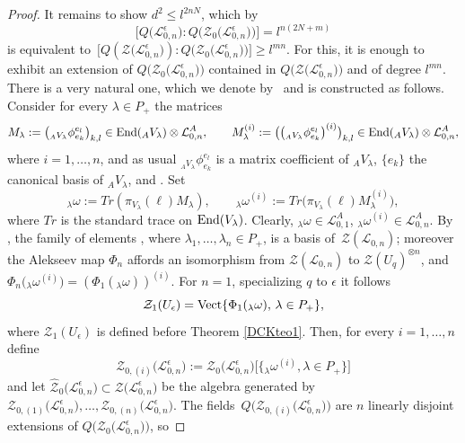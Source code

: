 \documentclass[10pt,a4paper]{amsart}
\numberwithin{equation}{section}
\theoremstyle{definition}
\newcommand{\e}{\epsilon}
\newcommand{\Ll}{{\mathcal L}}
\begin{document}
\begin{proof}
It remains to show $d^2\leq l^{2nN}$, which by \[\bigl[Q\bigl(\Ll_{0,n}^\e\bigr):Q\bigl(\mathcal{Z}_0\bigl(\Ll_{0,n}^\e\bigr)\bigr)\bigr]= l^{n(2N+m)}\] is equivalent to~${\bigl[Q(\mathcal{Z}\bigl(\Ll_{0,n}^\e\bigr)):Q\bigl(\mathcal{Z}_0\bigl(\Ll_{0,n}^\e\bigr)\bigr)\bigr] \geq l^{mn}}$. For this, it is enough to exhibit an extension of $Q\bigl(\mathcal{Z}_0\bigl(\Ll_{0,n}^\e\bigr)\bigr)$ contained in $Q\bigl(\mathcal{Z}\bigl(\Ll_{0,n}^\e\bigr)\bigr)$ and of degree $l^{mn}$. There is a very natural one, which we denote by~\smash{$Q\big(\hat{\mathcal{Z}}_{0}\bigl(\Ll_{0,n}^\e\bigr)\big)$} and is constructed as follows. Consider for every $\lambda\in P_+$ the matrices
\[
M_\lambda:=\bigl({}_{{}_AV_{\lambda}}\phi_{e_k}^{e_l}\bigr)_{k,l}\in {\rm End}({}_AV_{\lambda})\otimes\Ll_{0,n}^A,\qquad M_\lambda^{(i)}:=\big(\bigl({}_{{}_AV_{\lambda}}\phi_{e_k}^{e_l}\bigr)^{(i)}\big)_{k,l}\in {\rm End}({}_AV_{\lambda})\otimes\Ll_{0,n}^A,
\]
where $i=1,\dots,n$, and as usual ${}_{{}_AV_{\lambda}}\phi_{e_k}^{e_l}$ is a matrix coefficient of ${}_AV_{\lambda}$, $\{e_k\}$ the canonical basis of ${}_AV_{\lambda}$, and . Set
\[
{}_{\lambda}\omega := Tr(\pi_{V_{\lambda}}(\ell)M_\lambda),\qquad {}_{\lambda}\omega^{(i)} := Tr\big(\pi_{V_{\lambda}}(\ell)M_\lambda^{(i)}\big),
\]
where $Tr$ is the standard trace on ${\rm End}(V_{\lambda})$. Clearly, ${}_{\lambda}\omega\in \Ll_{0,1}^A$, ${}_{\lambda}\omega^{(i)}\in \Ll_{0,n}^A$. By \cite[Propositions~4.8 and~6.24]{BR}, the family of elements , where $\lambda_1,\dots, \lambda_n\in P_+$, is a basis of~$\mathcal{Z}(\Ll_{0,n})$; moreover the Alekseev map $\Phi_n$ affords an isomorphism from $\mathcal{Z}(\Ll_{0,n})$ to $\mathcal{Z}(U_q)^{\otimes n}$, and $\Phi_n\big({}_{\lambda}\omega^{(i)}\big) = (\Phi_1({}_{\lambda}\omega))^{(i)}$. For $n=1$, specializing $q$ to $\e$ it follows
\begin{equation}\label{Z1omegalambda}
\mathcal{Z}_1(U_\e) = {\rm Vect} \lbrace \Phi_1({}_{\lambda}\omega), \, \lambda\in P_+ \rbrace ,
\end{equation}
where $\mathcal{Z}_1(U_\e)$ is defined before Theorem \ref{DCKteo1}. Then, for every $i=1,\dots,n$ define
\[\mathcal{Z}_{0,(i)}\bigl(\Ll_{0,n}^\e\bigr) := \mathcal{Z}_0\bigl(\Ll_{0,n}^\e\bigr)\big[\big\{{}_{\lambda}\omega^{(i)},\lambda\in P_+\big\}\big]
\]
and let $\hat{\mathcal{Z}}_{0}\bigl(\Ll_{0,n}^\e\bigr)\subset \mathcal{Z}\bigl(\Ll_{0,n}^\e\bigr)$ be the algebra generated by $\mathcal{Z}_{0,(1)}\bigl(\Ll_{0,n}^\e\bigr),\dots,\mathcal{Z}_{0,(n)}\bigl(\Ll_{0,n}^\e\bigr)$. The fields~${Q\bigl(\mathcal{Z}_{0,(i)}\bigl(\Ll_{0,n}^\e\bigr)\bigr)}$ are $n$ linearly disjoint extensions of $Q\bigl(\mathcal{Z}_0\bigl(\Ll_{0,n}^\e\bigr)\bigr)$, so

\end{proof}
\end{document}

